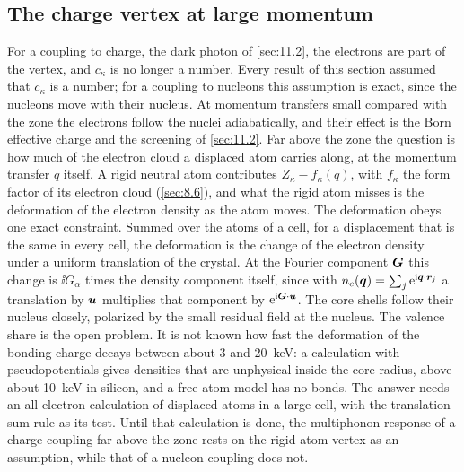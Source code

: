 \subsection{The charge vertex at large momentum}

For a coupling to charge, the dark photon of \cref{sec:11.2}, the electrons are part of the vertex, and $c_\kappa$ is no longer a number. Every result of this section assumed that $c_\kappa$ is a number; for a coupling to nucleons this assumption is exact, since the nucleons move with their nucleus. At momentum transfers small compared with the zone the electrons follow the nuclei adiabatically, and their effect is the Born effective charge and the screening of \cref{sec:11.2}. Far above the zone the question is how much of the electron cloud a displaced atom carries along, at the momentum transfer $q$ itself. A rigid neutral atom contributes $Z_\kappa - f_\kappa(q)$, with $f_\kappa$ the form factor of its electron cloud (\cref{sec:8.6}), and what the rigid atom misses is the deformation of the electron density as the atom moves. The deformation obeys one exact constraint. Summed over the atoms of a cell, for a displacement that is the same in every cell, the deformation is the change of the electron density under a uniform translation of the crystal. At the Fourier component $\bm{G}$ this change is $\ii G_\alpha$ times the density component itself, since with $n_e(\bm{q}) = \sum_j\mathrm{e}^{\mathrm{i}\bm{q}\cdot\bm{r}_j}$ a translation by $\bm{u}$ multiplies that component by $\mathrm{e}^{\mathrm{i}\bm{G}\cdot\bm{u}}$. The core shells follow their nucleus closely, polarized by the small residual field at the nucleus. The valence share is the open problem. It is not known how fast the deformation of the bonding charge decays between about 3 and \SI{20}{keV}: a calculation with pseudopotentials gives densities that are unphysical inside the core radius, above about \SI{10}{keV} in silicon, and a free-atom model has no bonds. The answer needs an all-electron calculation of displaced atoms in a large cell, with the translation sum rule as its test. Until that calculation is done, the multiphonon response of a charge coupling far above the zone rests on the rigid-atom vertex as an assumption, while that of a nucleon coupling does not.
